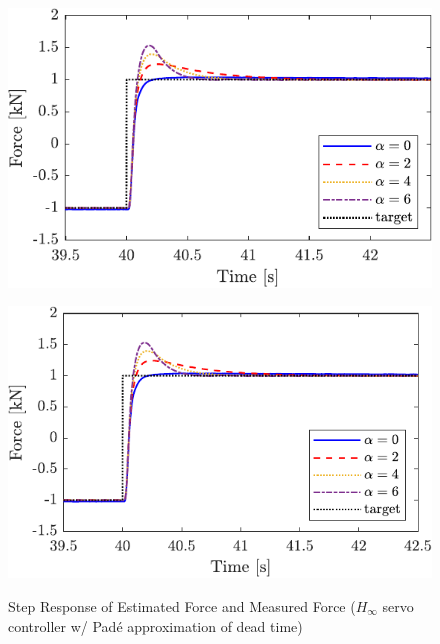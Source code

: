 \begin{figure}[t]
    \begin{minipage}{\minipageratio\hsize}
    \centering
        \includegraphics[keepaspectratio, scale = \minifigscale]{contents/ForceControl/figure/1115/crop-1115_JFPSHinf_estforcepade1_step.pdf}
        \label{fig4:crop-1115_JFPSHinf_estforcepade1_step}
    \end{minipage}
    \begin{minipage}{\minipageratio\hsize}
    \centering
        \includegraphics[keepaspectratio, scale = \minifigscale]{contents/ForceControl/figure/1115/crop-1115_JFPSHinf_forcepade1_step.pdf}
        \label{fig4:crop-1115_JFPSHinf_forcepade1_step}
    \end{minipage}
    \caption{Step Response of Estimated Force and Measured Force ($H_\infty$ servo controller w/ Pad\'e approximation of dead time)}
    \label{fig4:crop-1115_JFPSHinfpade1_step}
\end{figure}

